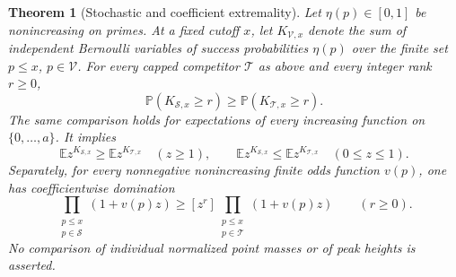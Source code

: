\documentclass[11pt]{article}
\newtheorem{theorem}{Theorem}[section]
\theoremstyle{definition}
\begin{document}
\begin{theorem}[Stochastic and coefficient extremality]
\label{thm:capped-prime-probability-extremum}
Let $\eta(p)\in[0,1]$ be nonincreasing on primes.
At a fixed cutoff $x$, let $K_{\mathcal V,x}$ denote the sum
of independent Bernoulli variables of success probabilities
$\eta(p)$ over the finite set $p\le x$, $p\in\mathcal V$.
For every capped competitor $\mathcal T$ as above and every
integer rank $r\ge0$,
\begin{equation}
 \mathbb P(K_{\mathcal S,x}\ge r)
                  \ge\mathbb P(K_{\mathcal T,x}\ge r).
 \label{eq:capped-prime-tail-extremum}
\end{equation}
The same comparison holds for expectations of every increasing
function on $\{0,\ldots,a\}$.
It implies
\[
 \mathbb E z^{K_{\mathcal S,x}}\ge\mathbb E z^{K_{\mathcal T,x}}
       \quad(z\ge1),\qquad
 \mathbb E z^{K_{\mathcal S,x}}\le\mathbb E z^{K_{\mathcal T,x}}
       \quad(0\le z\le1).
\]
Separately, for every nonnegative nonincreasing finite odds
function $v(p)$, one has coefficientwise domination
\begin{equation}
 [z^r]\prod_{\substack{p\le x\\p\in\mathcal S}}(1+v(p)z)
       \ge
 [z^r]\prod_{\substack{p\le x\\p\in\mathcal T}}(1+v(p)z)
                           \qquad(r\ge0).
 \label{eq:capped-prime-coefficient-extremum}
\end{equation}
No comparison of individual normalized point masses or of
peak heights is asserted.
\end{theorem}
\end{document}
